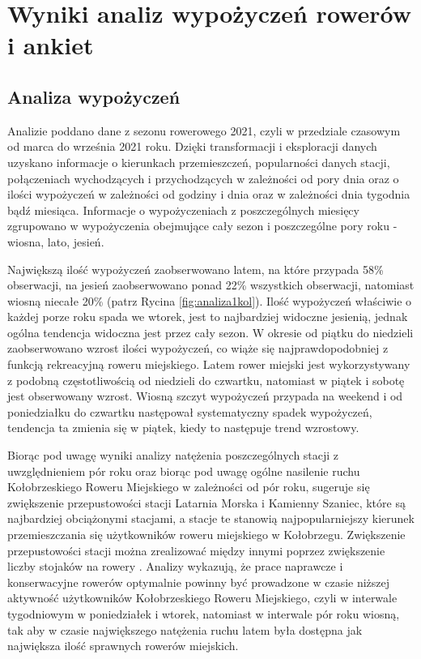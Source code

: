 \documentclass{amuthesis}
\begin{document}
\hypertarget{analizy}{%
\chapter{Wyniki analiz wypożyczeń rowerów i ankiet}\label{analizy}}

\hypertarget{analiza_wyp}{%
\section{Analiza wypożyczeń}\label{analiza_wyp}}

Analizie poddano dane z sezonu rowerowego 2021, czyli w przedziale czasowym od marca do września 2021 roku.
Dzięki transformacji i eksploracji danych uzyskano informacje o kierunkach przemieszczeń, popularności danych stacji, połączeniach wychodzących i przychodzących w zależności od pory dnia oraz o ilości wypożyczeń w zależności od godziny i dnia oraz w zależności dnia tygodnia bądź miesiąca.
Informacje o wypożyczeniach z poszczególnych miesięcy zgrupowano w wypożyczenia obejmujące cały sezon i poszczególne pory roku - wiosna, lato, jesień.

Największą ilość wypożyczeń zaobserwowano latem, na które przypada 58\% obserwacji, na jesień zaobserwowano ponad 22\% wszystkich obserwacji, natomiast wiosną niecałe 20\% (patrz Rycina \ref{fig:analiza1kol}).
Ilość wypożyczeń właściwie o każdej porze roku spada we wtorek, jest to najbardziej widoczne jesienią, jednak ogólna tendencja widoczna jest przez cały sezon.
W okresie od piątku do niedzieli zaobserwowano wzrost ilości wypożyczeń, co wiąże się najprawdopodobniej z funkcją rekreacyjną roweru miejskiego.
Latem rower miejski jest wykorzystywany z podobną częstotliwością od niedzieli do czwartku, natomiast w piątek i sobotę jest obserwowany wzrost.
Wiosną szczyt wypożyczeń przypada na weekend i od poniedziałku do czwartku następował systematyczny spadek wypożyczeń, tendencja ta zmienia się w piątek, kiedy to następuje trend wzrostowy.

Biorąc pod uwagę wyniki analizy natężenia poszczególnych stacji z uwzględnieniem pór roku oraz biorąc pod uwagę ogólne nasilenie ruchu Kołobrzeskiego Roweru Miejskiego w zależności od pór roku, sugeruje się zwiększenie przepustowości stacji Latarnia Morska i Kamienny Szaniec, które są najbardziej obciążonymi stacjami, a stacje te stanowią najpopularniejszy kierunek przemieszczania się użytkowników roweru miejskiego w Kołobrzegu.
Zwiększenie przepustowości stacji można zrealizować między innymi poprzez zwiększenie liczby stojaków na rowery
.
Analizy wykazują, że prace naprawcze i konserwacyjne rowerów optymalnie powinny być prowadzone w czasie niższej aktywność użytkowników Kołobrzeskiego Roweru Miejskiego, czyli w interwale tygodniowym w poniedziałek i wtorek, natomiast w interwale pór roku wiosną, tak aby w czasie największego natężenia ruchu latem była dostępna jak największa ilość sprawnych rowerów miejskich.
\end{document}
